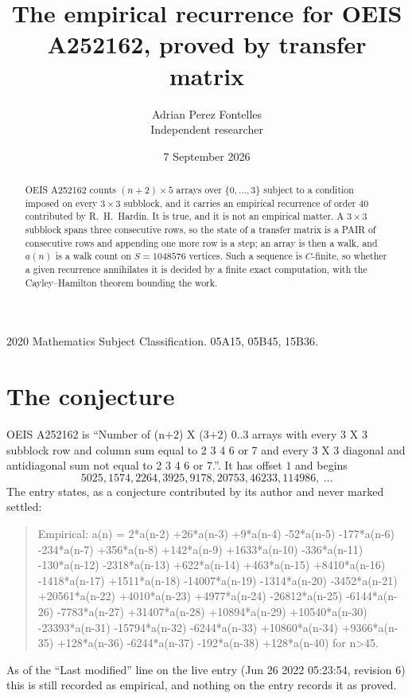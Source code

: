 \documentclass[11pt,a4paper]{article}
\title{The empirical recurrence for OEIS A252162, proved by transfer matrix}
\author{Adrian Perez Fontelles\\ \small Independent researcher}
\date{7 September 2026}
\theoremstyle{plain}
\theoremstyle{definition}
\begin{document}
\maketitle

\begin{abstract}
OEIS A252162 counts $(n+2)\times5$ arrays over $\{0,\dots,3\}$ subject to a condition imposed on
every $3\times3$ subblock, and it carries an empirical recurrence of order $40$
contributed by R.~H.~Hardin. It is true, and it is not an empirical matter. A $3\times3$
subblock spans three consecutive rows, so the state of a transfer matrix is a PAIR of
consecutive rows and appending one more row is a step; an array is then a walk, and
$a(n)$ is a walk count on $S=1048576$ vertices. Such a sequence is $C$-finite, so whether a given
recurrence annihilates it is decided by a finite exact computation, with the Cayley--Hamilton
theorem bounding the work.
\end{abstract}

\noindent\small 2020 Mathematics Subject Classification. 05A15, 05B45, 15B36.\normalsize

\section{The conjecture}

OEIS A252162 is ``Number of (n+2) X (3+2) 0..3 arrays with every 3 X 3 subblock row and column sum equal to 2 3 4 6 or 7 and every 3 X 3 diagonal and antidiagonal sum not equal to 2 3 4 6 or 7.''. It has offset $1$ and begins
\[
5025, 1574, 2264, 3925, 9178, 20753, 46233, 114986,\ \dots
\]
The entry states, as a conjecture contributed by its author and never marked settled:
\begin{quote}
Empirical: a(n) = 2*a(n-2) +26*a(n-3) +9*a(n-4) -52*a(n-5) -177*a(n-6) -234*a(n-7) +356*a(n-8) +142*a(n-9) +1633*a(n-10) -336*a(n-11) -130*a(n-12) -2318*a(n-13) +622*a(n-14) +463*a(n-15) +8410*a(n-16) -1418*a(n-17) +1511*a(n-18) -14007*a(n-19) -1314*a(n-20) -3452*a(n-21) +20561*a(n-22) +4010*a(n-23) +4977*a(n-24) -26812*a(n-25) -6144*a(n-26) -7783*a(n-27) +31407*a(n-28) +10894*a(n-29) +10540*a(n-30) -23393*a(n-31) -15794*a(n-32) -6244*a(n-33) +10860*a(n-34) +9366*a(n-35) +128*a(n-36) -6244*a(n-37) -192*a(n-38) +128*a(n-40) for n>45.
\end{quote}
As of the ``Last modified'' line on the live entry (Jun 26 2022 05:23:54, revision 6) this is still
recorded as empirical, and nothing on the entry records it as proved.
\end{document}
